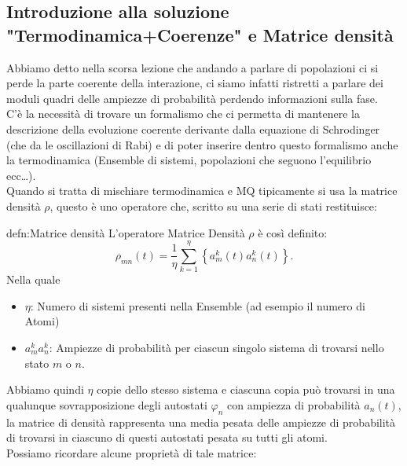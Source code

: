 \subsection{Introduzione alla soluzione "Termodinamica+Coerenze" e Matrice densità}%
Abbiamo detto nella scorsa lezione che andando a parlare di popolazioni ci si perde la parte coerente della interazione, ci siamo infatti ristretti a parlare dei moduli quadri delle ampiezze di probabilità perdendo informazioni sulla fase.\\
C'è la necessità di trovare un formalismo che ci permetta di mantenere la descrizione della evoluzione coerente derivante dalla equazione di Schrodinger (che da le oscillazioni di Rabi) e di poter inserire dentro questo formalismo anche la termodinamica (Ensemble di sistemi, popolazioni che seguono l'equilibrio ecc\ldots). \\
Quando si tratta di mischiare termodinamica e MQ tipicamente si usa la matrice densità $\rho$, questo è uno operatore che, scritto su una serie di stati restituisce:
\begin{defn}{defn:Matrice densità}
    L'operatore Matrice Densità $\rho$ è così definito:
\[
    \rho_{mn}(t) = \frac{1}{\eta}\sum_{k=1}^{\eta} \left\{a^k_m(t) a^k_n(t) \right\}
.\] 
Nella quale 
\begin{itemize}
    \item $\eta$: Numero di sistemi presenti nella Ensemble (ad esempio il numero di Atomi)
    \item $a_{m}^ka_n^k$: Ampiezze di probabilità per ciascun singolo sistema di trovarsi nello stato $m$ o $n$.
\end{itemize}
\end{defn}
Abbiamo quindi $\eta$ copie dello stesso sistema e ciascuna copia può trovarsi in una qualunque sovrapposizione degli autostati $\varphi_n$ con ampiezza di probabilità $a_n(t)$, la matrice di densità rappresenta una media pesata delle ampiezze di probabilità di trovarsi in ciascuno di questi autostati pesata su tutti gli atomi. \\
Possiamo ricordare alcune proprietà di tale matrice:
